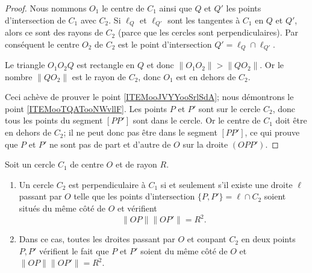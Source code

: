 \begin{proof}
    Nous nommons \( O_1\) le centre de \( C_1\) ainsi que \( Q\) et \( Q'\) les points d'intersection de \( C_1\) avec \( C_2\). Si \( \ell_Q\) et \( \ell_{Q'} \) sont les tangentes à \( C_1\) en \( Q\) et \( Q'\), alors ce sont des rayons de \( C_2\) (parce que les cercles sont perpendiculaires). Par conséquent le centre \( O_2\) de \( C_2\) est le point d'intersection \( Q'=\ell_Q\cap \ell_{Q'}\).

    Le triangle \( O_1O_2Q\) est rectangle en \( Q\) et donc \( \| O_1O_2 \|>\| QO_2 \| \). Or le nombre \( \| QO_2 \|\) est le rayon de \( C_2\), donc \( O_1\) est en dehors de \( C_2\).

    Ceci achève de prouver le point \ref{ITEMooJVYYooSrlSdA}; nous démontrons le point \ref{ITEMooTQATooNWvllF}. Les points \( P\) et \( P'\) sont sur le cercle \( C_2\), donc tous les points du segment \( [PP']  \) sont dans le cercle. Or le centre de \( C_1\) doit être en dehors de \( C_2\); il ne peut donc pas être dans le segment \( [PP']\), ce qui prouve que \( P\) et \( P'\) ne sont pas de part et d'autre de \( O\) sur la droite \( (OPP')\).
\end{proof}

\begin{proposition}      \label{PROPooYSVYooOFKxib}
    Soit un cercle \( C_1\) de centre \( O\) et de rayon \( R\).
    \begin{enumerate}
        \item       \label{ITEMooWYIJooAAmXUl}
            Un cercle \( C_2\) est perpendiculaire à \( C_1\) si et seulement s'il existe une droite \( \ell\) passant par \( O\) telle que les points d'intersection \( \{ P,P' \}= \ell\cap C_2\) soient situés du même côté de \( O\) et vérifient
            \begin{equation}   
        \| OP \|\| OP' \|=R^2.
    \end{equation}
        \item       \label{ITEMooYKZOooYZKyhF}
            Dans ce cas, toutes les droites passant par \( O\) et coupant \( C_2\) en deux points \( P,P'\) vérifient le fait que \( P\) et \( P'\) soient du même côté de \( O\) et \( \| OP \|\| OP' \|=R^2\).
    \end{enumerate}
\end{proposition}

